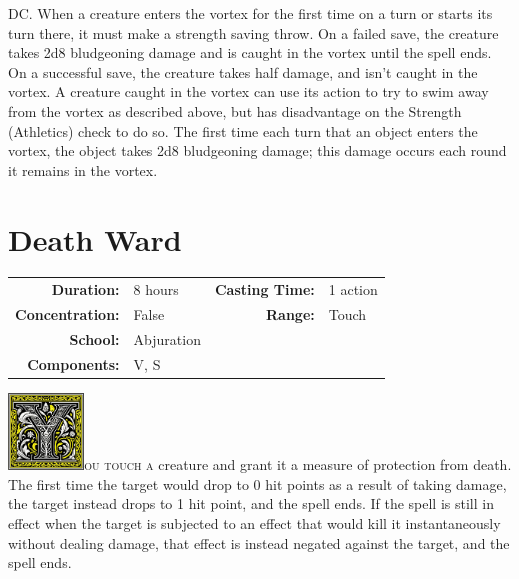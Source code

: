 \documentclass[12pt,showtrims]{memoir}
\begin{document}
DC. When a creature enters the vortex for the first time on a turn or starts its turn there, it must make a strength saving throw. On a failed save, the creature takes 2d8 bludgeoning damage and is caught in the vortex until the spell ends. On a successful save, the creature takes half damage, and isn't caught in the vortex. A creature caught in the vortex can use its action to try to swim away from the vortex as described above, but has disadvantage on the Strength (Athletics) check to do so. The first time each turn that an object enters the vortex, the object takes 2d8 bludgeoning damage; this damage occurs each round it remains in the vortex.

\newpage
\section*{Death Ward}

{
\small\centering\vspace{-6pt}
\begin{tabular}{rlrl}
\toprule

\textbf{Duration:} & 8 hours &
\textbf{Casting Time:} & 1 action \\
\textbf{Concentration:} & False &
\textbf{Range:} & Touch \\
\textbf{School:} & Abjuration \\
\textbf{Components:} & \multicolumn{3}{p{0.7\textwidth}}{V, S}\\

\bottomrule
\end{tabular}
}

\vspace{1\baselineskip}\noindent 
\lettrine[lines=4]{\includegraphics[height=58pt]{initials/Y.png}}{ou touch a} creature and grant it a measure of protection from death. The first time the target would drop to 0 hit points as a result of taking damage, the target instead drops to 1 hit point, and the spell ends. If the spell is still in effect when the target is subjected to an effect that would kill it instantaneously without dealing damage, that effect is instead negated against the target, and the spell ends.

\newpage
\end{document}
